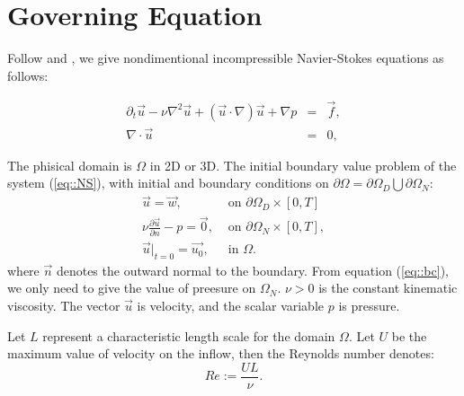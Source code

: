 \documentclass[a4paper, 11pt]{article}
\begin{document}
\section{Governing Equation}

    Follow \cite{popiolek2006numerical} and \cite{elman2005finite}, we
    give nondimentional incompressible Navier-Stokes equations as
    follows:
    
    \begin{equation}
      \begin{array}{rcl}
         \partial_t \vec{u} - \nu \nabla^2 \vec{u} +
        (\vec{u} \cdot \nabla )\vec{u} + \nabla p & =
        & \vec{f},\\
        \nabla \cdot \vec{u} & = & 0,
      \end{array}
      \label{eq::NS}
    \end{equation}

    The phisical domain is $\Omega$ in 2D or 3D. The initial boundary
    value problem of the system (\ref{eq::NS}), with initial and
    boundary conditions on $\partial \Omega = \partial \Omega_D
    \bigcup \partial \Omega_N$:
    \begin{equation}
      \begin{array}{ll}
        \vec{u} = \vec{w},& \mbox{ on } \partial \Omega_D \times [0,
        T]\\
        \nu \displaystyle \frac{\partial \vec{u}}{\partial n} - p =
        \vec{0}, & \mbox{ on } \partial \Omega_N \times [0, T],  \\
        \vec{u}|_{t = 0} = \vec{u_0}, & \mbox{ in } \Omega. 
      \end{array}
      \label{eq::bc}
    \end{equation} 
    where $\vec{n}$ denotes the outward normal to the boundary. From
    equation (\ref{eq::bc}), we only need to give the value of
    preesure on $\Omega_N$. $\nu > 0$ is the constant kinematic
    viscosity. The vector $\vec{u}$ is velocity, and the scalar
    variable $p$ is pressure. 

    Let $L$ represent a characteristic length scale for the domain
    $\Omega$. Let $U$ be the maximum value of velocity on the inflow,
    then the Reynolds number denotes:
    \begin{equation}
      Re := \frac{UL}{\nu}.
    \end{equation}
    
\end{document}
